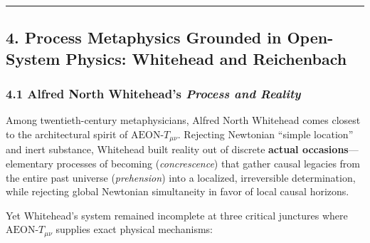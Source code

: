 \documentclass[
]{article}
\begin{document}
\begin{center}\rule{0.5\linewidth}{0.5pt}\end{center}

\subsection{4. Process Metaphysics Grounded in Open-System Physics:
Whitehead and
Reichenbach}\label{process-metaphysics-grounded-in-open-system-physics-whitehead-and-reichenbach}

\subsubsection{\texorpdfstring{4.1 Alfred North Whitehead's
\emph{Process and
Reality}}{4.1 Alfred North Whitehead's Process and Reality}}\label{alfred-north-whiteheads-process-and-reality}

Among twentieth-century metaphysicians, Alfred North Whitehead comes
closest to the architectural spirit of \(\text{AEON-}T_{\mu\nu}\).
Rejecting Newtonian ``simple location'' and inert substance, Whitehead
built reality out of discrete \textbf{actual occasions}---elementary
processes of becoming (\emph{concrescence}) that gather causal legacies
from the entire past universe (\emph{prehension}) into a localized,
irreversible determination, while rejecting global Newtonian
simultaneity in favor of local causal horizons.

Yet Whitehead's system remained incomplete at three critical junctures
where \(\text{AEON-}T_{\mu\nu}\) supplies exact physical mechanisms:
\end{document}
